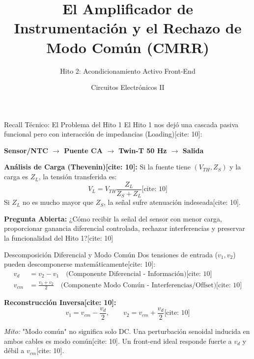 \documentclass[aspectratio=169]{beamer}
\title[In-Amp y CMRR]{El Amplificador de Instrumentación y el Rechazo de Modo Común (CMRR)}
\subtitle{Hito 2: Acondicionamiento Activo Front-End}
\author[IMT-221]{Circuitos Electrónicos II}
\institute[UCB Tarija]{Universidad Católica Boliviana ``San Pablo''}
\date{}
\begin{document}
\begin{frame}
    \titlepage
\end{frame}

\begin{frame}{Recall Técnico: El Problema del Hito 1}
    El Hito 1 nos dejó una cascada pasiva funcional pero con interacción de impedancias (Loading)[cite: 10]:
    \begin{center}
        \textbf{Sensor/NTC $\rightarrow$ Puente CA $\rightarrow$ Twin-T 50 Hz $\rightarrow$ Salida}
    \end{center}
    
    \textbf{Análisis de Carga (Thevenin)[cite: 10]:}
    Si la fuente tiene $(V_{TH}, Z_S)$ y la carga es $Z_L$, la tensión transferida es:
    \begin{equation*}
        V_L = V_{TH}\frac{Z_L}{Z_S + Z_L} \text{[cite: 10]}
    \end{equation*}
    Si $Z_L$ no es mucho mayor que $Z_S$, la señal sufre atenuación indeseada[cite: 10].
    
    \vspace{0.2cm}
    \begin{tcolorbox}[colback=ucbblue!5, colframe=ucbblue]
        \textbf{Pregunta Abierta:} ¿Cómo recibir la señal del sensor con menor carga, proporcionar ganancia diferencial controlada, rechazar interferencias y preservar la funcionalidad del Hito 1?[cite: 10]
    \end{tcolorbox}
\end{frame}

\begin{frame}{Descomposición Diferencial y Modo Común}
    Dos tensiones de entrada ($v_1, v_2$) pueden descomponerse matemáticamente[cite: 10]:
    \begin{align*}
        v_d &= v_2 - v_1 \quad \text{(Componente Diferencial - Información)} \text{[cite: 10]} \\
        v_{cm} &= \frac{v_1 + v_2}{2} \quad \text{(Componente Modo Común - Interferencias/Offset)} \text{[cite: 10]}
    \end{align*}
    
    \textbf{Reconstrucción Inversa[cite: 10]:}
    \begin{equation*}
        v_1 = v_{cm} - \frac{v_d}{2}, \qquad v_2 = v_{cm} + \frac{v_d}{2} \text{[cite: 10]}
    \end{equation*}
    
    \textit{Mito:} "Modo común" no significa solo DC. Una perturbación senoidal inducida en ambos cables es modo común[cite: 10]. Un front-end ideal responde fuerte a $v_d$ y débil a $v_{cm}$[cite: 10].
\end{frame}
\end{document}
